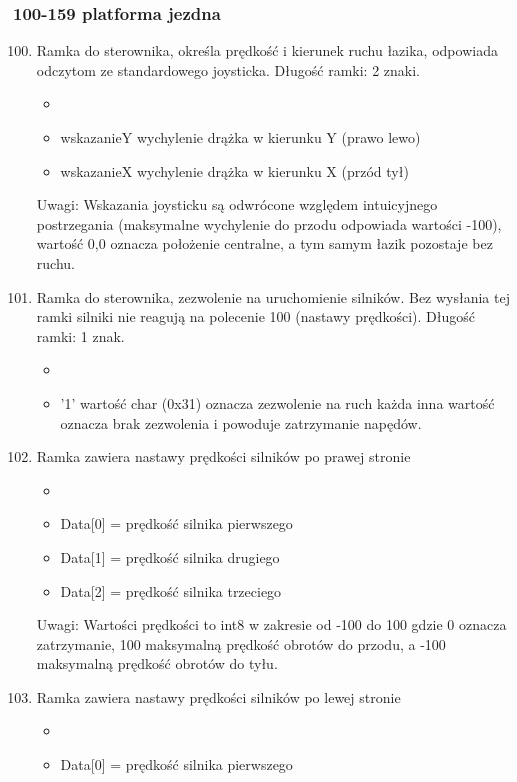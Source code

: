 \documentclass{article}
\begin{document}
\subsubsection*{100-159 platforma jezdna}
	\begin{enumerate}
	\setcounter{enumi}{99}
	\item Ramka do sterownika, określa prędkość i kierunek ruchu łazika, odpowiada odczytom ze standardowego joysticka. Długość ramki: 2 znaki.
		\begin{itemize}
		\item {}
		\item wskazanieY wychylenie drążka w kierunku Y (prawo lewo) 
		\item wskazanieX wychylenie drążka w kierunku X (przód tył)
		\end{itemize}
	 Uwagi: Wskazania joysticku są odwrócone względem intuicyjnego postrzegania (maksymalne wychylenie do przodu odpowiada wartości -100), 	wartość 0,0 oznacza położenie centralne, a tym samym łazik pozostaje bez ruchu. 
	\item Ramka do sterownika, zezwolenie na uruchomienie silników. Bez wysłania tej ramki silniki nie reagują na polecenie 100 (nastawy prędkości). Długość ramki: 1 znak.
		\begin{itemize}
		\item {}
		\item '1' wartość char (0x31) oznacza zezwolenie na ruch każda inna wartość oznacza brak zezwolenia i powoduje zatrzymanie napędów.
		\end{itemize}
  	\item Ramka zawiera nastawy prędkości silników po prawej stronie
  		\begin{itemize}
  		\item {}
 		\item Data[0] = prędkość silnika pierwszego 
 		\item Data[1] = prędkość silnika drugiego
  		\item Data[2] = prędkość silnika trzeciego
 		\end{itemize}
 	Uwagi: Wartości prędkości to int8 w zakresie od -100 do 100 gdzie 0 oznacza zatrzymanie, 100 maksymalną prędkość obrotów do przodu, a -100 maksymalną prędkość obrotów do tyłu.
  	\item Ramka zawiera nastawy prędkości silników po lewej stronie
  		\begin{itemize}
  		\item {}
  		\item Data[0] = prędkość silnika pierwszego 

\end{itemize}
\end{enumerate}
\end{document}
